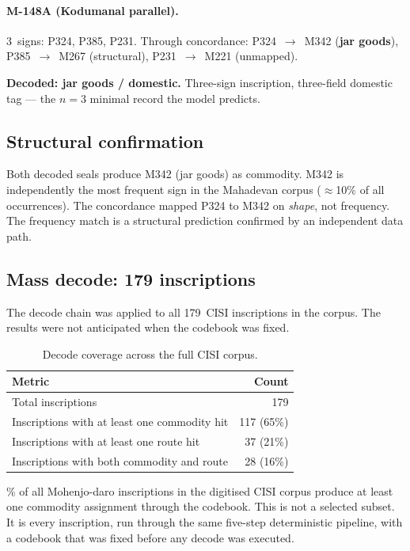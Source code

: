 \paragraph{M-148A (Kodumanal parallel).}
3~signs: P324, P385, P231.
Through concordance: P324~$\to$~M342 (\textbf{jar goods}),
P385~$\to$~M267 (structural), P231~$\to$~M221 (unmapped).

\textbf{Decoded: jar goods / domestic.}
Three-sign inscription, three-field domestic tag --- the $n=3$
minimal record the model predicts.

\subsection{Structural confirmation}

Both decoded seals produce M342 (jar goods) as commodity.
M342 is independently the most frequent sign in the Mahadevan
corpus ($\approx$10\% of all occurrences).
The concordance mapped P324 to M342 on \emph{shape}, not frequency.
The frequency match is a structural prediction confirmed by an
independent data path.

\subsection{Mass decode: 179 inscriptions}

The decode chain was applied to all 179~CISI inscriptions in the
corpus. The results were not anticipated when the codebook was
fixed.

\begin{longtable}{@{}lr@{}}
\caption{Decode coverage across the full CISI corpus.}
\label{tab:mass-decode}\\
\toprule
Metric & Count \\
\midrule
\endfirsthead
\bottomrule
\endlastfoot
Total inscriptions & 179 \\
\midrule
Inscriptions with at least one commodity hit & 117 (65\%) \\
\midrule
Inscriptions with at least one route hit & 37 (21\%) \\
\midrule
Inscriptions with both commodity and route & 28 (16\%) \\
\end{longtable}

\% of all Mohenjo-daro inscriptions in the digitised CISI corpus
produce at least one commodity assignment through the codebook.
This is not a selected subset. It is every inscription, run through
the same five-step deterministic pipeline, with a codebook that was
fixed before any decode was executed.


